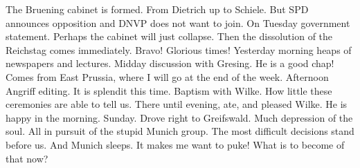 The Bruening cabinet is formed. From Dietrich up to Schiele. But SPD announces opposition and DNVP does not want to join. On Tuesday government statement. Perhaps the cabinet will just collapse. Then the dissolution of the Reichstag comes immediately. Bravo! Glorious times! Yesterday morning heaps of newspapers and lectures. Midday discussion with Gresing. He is a good chap! Comes from East Prussia, where I will go at the end of the week. Afternoon Angriff editing. It is splendit this time. Baptism with Wilke. How little these ceremonies are able to tell us. There until evening, ate, and pleased Wilke. He is happy in the morning. Sunday. Drove right to Greifswald. Much depression of the soul. All in pursuit of the stupid Munich group. The most difficult decisions stand before us. And Munich sleeps. It makes me want to puke! What is to become of that now?